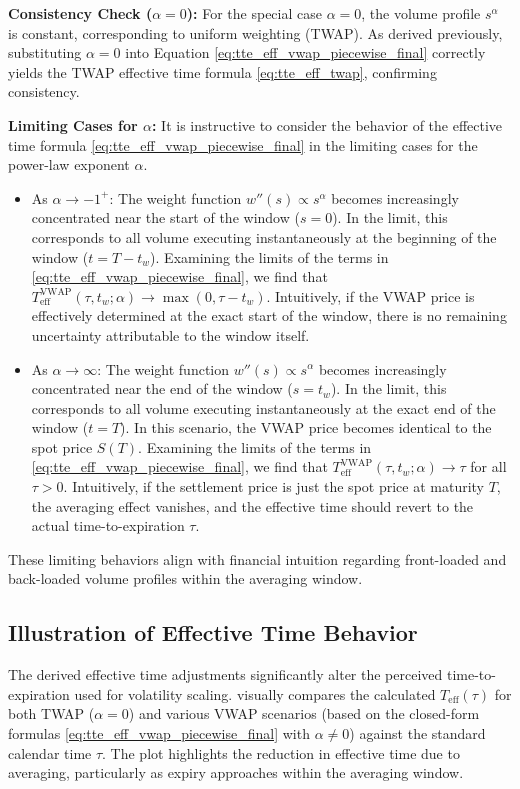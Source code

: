 \documentclass[11pt]{article}
\theoremstyle{plain}
\begin{document}
\textbf{Consistency Check ($\alpha=0$):}
For the special case $\alpha=0$, the volume profile $s^\alpha$ is constant, corresponding to uniform weighting (TWAP). As derived previously, substituting $\alpha=0$ into Equation \eqref{eq:tte_eff_vwap_piecewise_final} correctly yields the TWAP effective time formula \eqref{eq:tte_eff_twap}, confirming consistency.


\textbf{Limiting Cases for $\alpha$:} %
It is instructive to consider the behavior of the effective time formula \eqref{eq:tte_eff_vwap_piecewise_final} in the limiting cases for the power-law exponent $\alpha$.
\begin{itemize}
    \item As $\alpha \to -1^+$: The weight function $w''(s) \propto s^\alpha$ becomes increasingly concentrated near the start of the window ($s=0$). In the limit, this corresponds to all volume executing instantaneously at the beginning of the window ($t=T-t_w$). Examining the limits of the terms in \eqref{eq:tte_eff_vwap_piecewise_final}, we find that $T_{\mathrm{eff}}^{\mathrm{VWAP}}(\tau, t_w; \alpha) \to \max(0, \tau-t_w)$. Intuitively, if the VWAP price is effectively determined at the exact start of the window, there is no remaining uncertainty attributable to the window itself.
    \item As $\alpha \to \infty$: The weight function $w''(s) \propto s^\alpha$ becomes increasingly concentrated near the end of the window ($s=t_w$). In the limit, this corresponds to all volume executing instantaneously at the exact end of the window ($t=T$). In this scenario, the VWAP price becomes identical to the spot price $S(T)$. Examining the limits of the terms in \eqref{eq:tte_eff_vwap_piecewise_final}, we find that $T_{\mathrm{eff}}^{\mathrm{VWAP}}(\tau, t_w; \alpha) \to \tau$ for all $\tau > 0$. Intuitively, if the settlement price is just the spot price at maturity $T$, the averaging effect vanishes, and the effective time should revert to the actual time-to-expiration $\tau$.
\end{itemize}
These limiting behaviors align with financial intuition regarding front-loaded and back-loaded volume profiles within the averaging window.




\subsection{Illustration of Effective Time Behavior}
\label{sec:Teff_illustration}
The derived effective time adjustments significantly alter the perceived time-to-expiration used for volatility scaling.  visually compares the calculated $T_{\mathrm{eff}}(\tau)$ for both TWAP ($\alpha=0$) and various VWAP scenarios (based on the closed-form formulas \cref{eq:tte_eff_vwap_piecewise_final} with $\alpha \neq 0$) against the standard calendar time $\tau$. The plot highlights the reduction in effective time due to averaging, particularly as expiry approaches within the averaging window.
\end{document}

